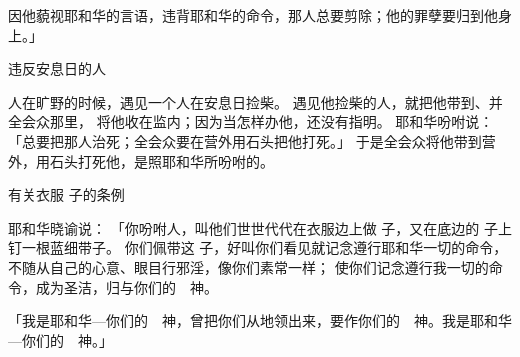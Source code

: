 {因他藐视耶和华的言语，违背耶和华的命令，那人总要剪除；他的罪孽要归到他身上。」
\par }{\SH 违反安息日的人
\par }{\PP {}人在旷野的时候，遇见一个人在安息日捡柴。
遇见他捡柴的人，就把他带到{}、{}并全会众那里，
将他收在监内；因为当怎样办他，还没有指明。
耶和华吩咐{}说：「总要把那人治死；全会众要在营外用石头把他打死。」
于是全会众将他带到营外，用石头打死他，是照耶和华所吩咐{}的。
\par }{\SH 有关衣服 子的条例
\par }{\PP {}耶和华晓谕{}说：
「你吩咐{}人，叫他们世世代代在衣服边上做 子，又在底边的 子上钉一根蓝细带子。
你们佩带这 子，好叫你们看见就记念遵行耶和华一切的命令，不随从自己的心意、眼目行邪淫，像你们素常一样；
使你们记念遵行我一切的命令，成为圣洁，归与你们的　神。
\par }{\PP {}「我是耶和华—你们的　神，曾把你们从{}地领出来，要作你们的　神。我是耶和华—你们的　神。」

}
